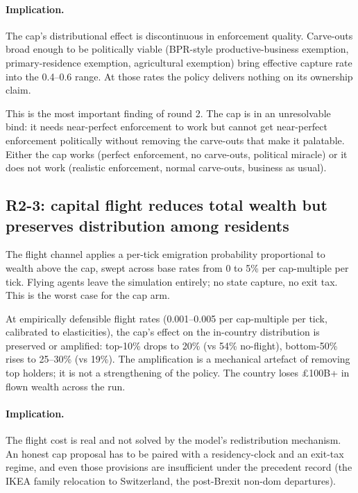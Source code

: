\documentclass[11pt]{article}
\begin{document}
\paragraph{Implication.}  The cap's distributional effect is
discontinuous in enforcement quality.  Carve-outs broad enough to
be politically viable (BPR-style productive-business exemption,
primary-residence exemption, agricultural exemption) bring
effective capture rate into the 0.4--0.6 range.  At those rates the
policy delivers nothing on its ownership claim.

This is the most important finding of round 2.  The cap is in an
unresolvable bind: it needs near-perfect enforcement to work but
cannot get near-perfect enforcement politically without removing
the carve-outs that make it palatable.  Either the cap works
(perfect enforcement, no carve-outs, political miracle) or it
does not work (realistic enforcement, normal carve-outs, business
as usual).

\subsection{R2-3: capital flight reduces total wealth but
preserves distribution among residents}

The flight channel applies a per-tick emigration probability
proportional to wealth above the cap, swept across base rates from
0 to 5\% per cap-multiple per tick.  Flying agents leave the
simulation entirely; no state capture, no exit tax.  This is the
worst case for the cap arm.

At empirically defensible flight rates (0.001--0.005 per
cap-multiple per tick, calibrated to
\citet{young2016millionaire, moretti2017taxing} elasticities), the
cap's effect on the in-country distribution is preserved or
amplified: top-10\% drops to 20\% (vs 54\% no-flight), bottom-50\%
rises to 25--30\% (vs 19\%).  The amplification is a mechanical
artefact of removing top holders; it is not a strengthening of the
policy.  The country loses \pounds 100B+ in flown wealth across the
run.

\paragraph{Implication.}  The flight cost is real and not solved by
the model's redistribution mechanism.  An honest cap proposal has
to be paired with a residency-clock and an exit-tax regime, and
even those provisions are insufficient under the precedent record
(the IKEA family relocation to Switzerland, the post-Brexit non-dom
departures).
\end{document}

